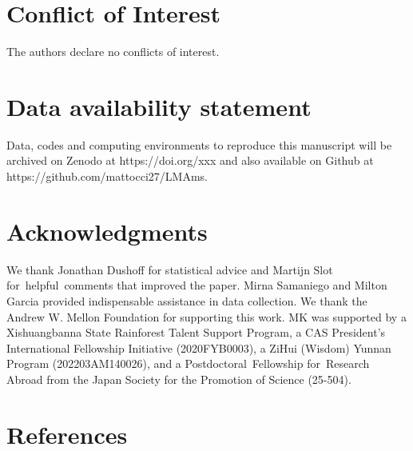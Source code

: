 \documentclass[
  12pt,
  letterpaper,
  DIV=11,
  numbers=noendperiod]{scrartcl}
\begin{document}
\section{Conflict of Interest}\label{conflict-of-interest}

The authors declare no conflicts of interest.

\section{Data availability statement}\label{data-availability-statement}

Data, codes and computing environments to reproduce this manuscript will
be archived on Zenodo at https://doi.org/xxx and also available on
Github at https://github.com/mattocci27/LMAms.

\section{Acknowledgments}\label{acknowledgments}

We thank Jonathan Dushoff for statistical advice and Martijn Slot
for~helpful~comments that improved the paper. Mirna Samaniego and Milton
Garcia provided indispensable assistance in data collection. We thank
the Andrew W. Mellon Foundation for supporting this work. MK was
supported by a Xishuangbanna State Rainforest Talent Support Program, a
CAS President's International Fellowship Initiative (2020FYB0003), a
ZiHui (Wisdom) Yunnan Program (202203AM140026), and a
Postdoctoral~Fellowship for~Research Abroad from the Japan Society for
the Promotion of Science (25-504).

\section{References}\label{references}
\end{document}
